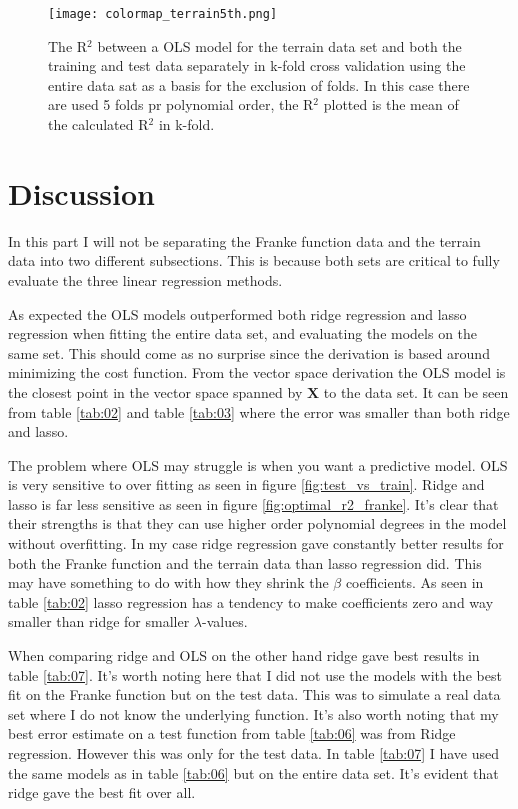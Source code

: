 \documentclass[uio,jmp,amsmath,amssymb,reprint,nofootinbib]{revtex4-1}
\numberwithin{equation}{section}
\begin{document}
\begin{figure}[H]
    \centering
    \texttt{[image: colormap\_terrain5th.png]}
    \caption{The R\(^2\) between a OLS model for the terrain data set and both the training and test data separately in k-fold cross validation using the entire data sat as a basis for the exclusion of folds. In this case there are used 5 folds pr polynomial order, the R\(^2\) plotted is the mean of the calculated R\(^2\) in k-fold.}
    \label{fig:colormap_terrain_model5th}
\end{figure}

\section{Discussion}\label{sec:Discussion}

In this part I will not be separating the Franke function data and the terrain data into two different subsections. This is because both sets are critical to fully evaluate the three linear regression methods.

As expected the OLS models outperformed both ridge regression and lasso regression when fitting the entire data set, and evaluating the models on the same set. This should come as no surprise since the derivation is based around minimizing the cost function. From the vector space derivation the OLS model is the closest point in the vector space spanned by \(\bm{X}\) to the data set. It can be seen from table \ref{tab:02} and table \ref{tab:03} where the error was smaller than both ridge and lasso.

The problem where OLS may struggle is when you want a predictive model. OLS is very sensitive to over fitting as seen in figure \ref{fig:test_vs_train}. Ridge and lasso is far less sensitive as seen in figure \ref{fig:optimal_r2_franke}. It's clear that their strengths is that they can use higher order polynomial degrees in the model without overfitting. In my case ridge regression gave constantly better results for both the Franke function and the terrain data than lasso regression did. This may have something to do with how they shrink the \(\beta\) coefficients. As seen in table \ref{tab:02} lasso regression has a tendency to make coefficients zero and way smaller than ridge for smaller \(\lambda\)-values.

When comparing ridge and OLS on the other hand ridge gave best results in table \ref{tab:07}. It's worth noting here that I did not use the models with the best fit on the Franke function but on the test data. This was to simulate a real data set where I do not know the underlying function. It's also worth noting that my best error estimate on a test function from table \ref{tab:06} was from Ridge regression. However this was only for the test data. In table \ref{tab:07} I have used the same models as in table \ref{tab:06} but on the entire data set. It's evident that ridge gave the best fit over all.
\end{document}
